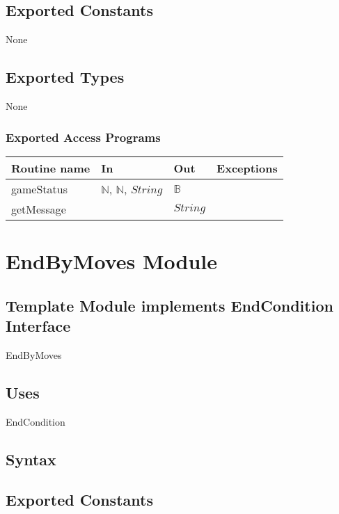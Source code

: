 \documentclass[12pt]{article}
\begin{document}
\subsection*{Exported Constants}

None

\subsection*{Exported Types}

None

\subsubsection* {Exported Access Programs}

\begin{tabular}{| l | l | l | p{6cm} |}
\hline
\textbf{Routine name} & \textbf{In} & \textbf{Out} & \textbf{Exceptions}\\
\hline
gameStatus & $\mathbb{N}$, $\mathbb{N}$, $String$ & $\mathbb{B}$ & \\
\hline
getMessage &  & $String$ & \\
\hline
\end{tabular}

\newpage

\section* {EndByMoves Module}

\subsection* {Template Module implements EndCondition Interface}

EndByMoves

\subsection*{Uses}

EndCondition

\subsection* {Syntax}

\subsection*{Exported Constants}
\end{document}
